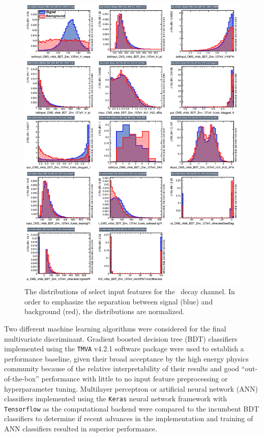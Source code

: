 \begin{figure}[htbp]
  \centering
    \includegraphics[width=6in]{images/features_Znn}
    \caption[Input Feature Distributions for the \ZnnH\ Channel]{The distributions of select input features for the \ZnnH\ decay channel. In order to emphasize the separation between signal (blue) and background (red), the distributions are normalized.}
    \label{fig:features_Znn}
\end{figure}

Two different machine learning algorithms were considered for the final multivariate discriminant. Gradient boosted decision tree (BDT)\cite{GBDT} classifiers implemented using the \texttt{TMVA} v4.2.1\cite{TMVA} software package were used to establish a performance baseline, given their broad acceptance by the high energy physics community because of the relative interpretability of their results and good ``out-of-the-box'' performance with little to no input feature preprocessing or hyperparameter tuning. Multilayer perceptron\cite{MLP} or artificial neural network (ANN) classifiers implemented using the \texttt{Keras} neural network framework with \texttt{Tensorflow} as the computational backend were compared to the incumbent BDT classifiers to determine if recent advances in the implementation and training of ANN classifiers resulted in superior performance.

